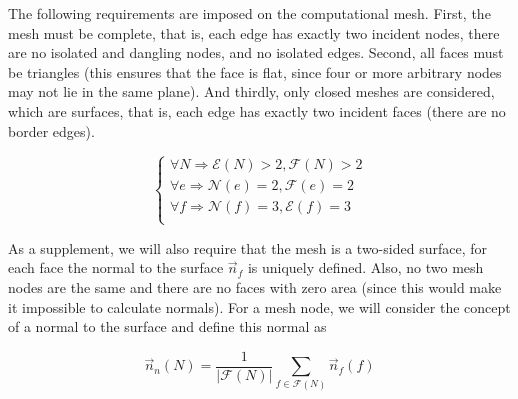 \documentclass[
11pt,%
tightenlines,%
twoside,%
onecolumn,%
nofloats,%
nobibnotes,%
nofootinbib,%
superscriptaddress,%
noshowpacs,%
centertags]%
{revtex4}
\begin{document}
The following requirements are imposed on the computational mesh.
First, the mesh must be complete, that is, each edge has exactly two incident nodes, there are no isolated and dangling nodes, and no isolated edges.
Second, all faces must be triangles (this ensures that the face is flat, since four or more arbitrary nodes may not lie in the same plane).
And thirdly, only closed meshes are considered, which are surfaces, that is, each edge has exactly two incident faces (there are no border edges).

\begin{equation}\label{eq_arch}
\begin{cases}
\forall N \Rightarrow \mathscr{E}(N) > 2, \mathscr{F}(N) > 2 \\
\forall e \Rightarrow \mathscr{N}(e) = 2 , \mathscr{F}(e) = 2 \\
\forall f \Rightarrow \mathscr{N}(f) = 3 , \mathscr{E}(f) = 3 \\
\end{cases}
\end{equation}

As a supplement, we will also require that the mesh is a two-sided surface, for each face the normal to the surface $\vec{n}_f$ is uniquely defined.
Also, no two mesh nodes are the same and there are no faces with zero area (since this would make it impossible to calculate normals).
For a mesh node, we will consider the concept of a normal to the surface and define this normal as

\begin{equation}
\vec{n}_n(N) = \frac{1}{|\mathscr{F}(N)|} \sum_{f \in \mathscr{F}(N)}{\vec{n}_f(f)}
\end{equation}
\end{document}
